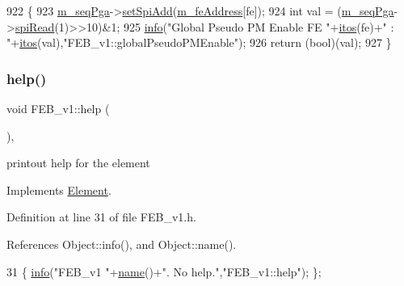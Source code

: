 \begin{DoxyCode}
922                                          \{
923   \hyperlink{classFEB__v1_a6c7804ac86796f233a8393043adf2e77}{m\_seqPga}->\hyperlink{classSeqPGA_ac998ce3a6d9b5f2e88cc8393f8c1df53}{setSpiAdd}(\hyperlink{classFEB__v1_a4e1945c2d5b434125f375e9d0fc6d99f}{m\_feAddress}[fe]);
924   \textcolor{keywordtype}{int} val = (\hyperlink{classFEB__v1_a6c7804ac86796f233a8393043adf2e77}{m\_seqPga}->\hyperlink{classSeqPGA_ab3d0e5e5d4014bc7a92588a76b8713d4}{spiRead}(1)>>10)&1;
925   \hyperlink{classObject_a644fd329ea4cb85f54fa6846484b84a8}{info}(\textcolor{stringliteral}{"Global Pseudo PM Enable FE "}+\hyperlink{Tools_8h_af330027dbdafb9a30768b3613c553e60}{itos}(fe)+\textcolor{stringliteral}{" : "}+\hyperlink{Tools_8h_af330027dbdafb9a30768b3613c553e60}{itos}(val),\textcolor{stringliteral}{"FEB\_v1::globalPseudoPMEnable"});
926   \textcolor{keywordflow}{return} (\textcolor{keywordtype}{bool})(val);
927 \}
\end{DoxyCode}
\mbox{\label{classFEB__v1_af93db546ad89ba7c2301fdc2314efd8a}} 
\subsubsection{\texorpdfstring{help()}{help()}}
{\footnotesize\ttfamily void F\+E\+B\+\_\+v1\+::help (\begin{DoxyParamCaption}{ }\end{DoxyParamCaption})\hspace{0.3cm}{\ttfamily [inline]}, {\ttfamily [virtual]}}

printout help for the element 

Implements \hyperlink{classElement_a32c0de27acb08e17251cef88c3e9303a}{Element}.



Definition at line 31 of file F\+E\+B\+\_\+v1.\+h.



References Object\+::info(), and Object\+::name().


\begin{DoxyCode}
31 \{ \hyperlink{classObject_a644fd329ea4cb85f54fa6846484b84a8}{info}(\textcolor{stringliteral}{"FEB\_v1 "}+\hyperlink{classObject_a300f4c05dd468c7bb8b3c968868443c1}{name}()+\textcolor{stringliteral}{". No help."},\textcolor{stringliteral}{"FEB\_v1::help"}); \};
\end{DoxyCode}
\mbox{\label{classFEB__v1_a70d7d266c7d05fdfab21d5b0293f1ad8}} 
